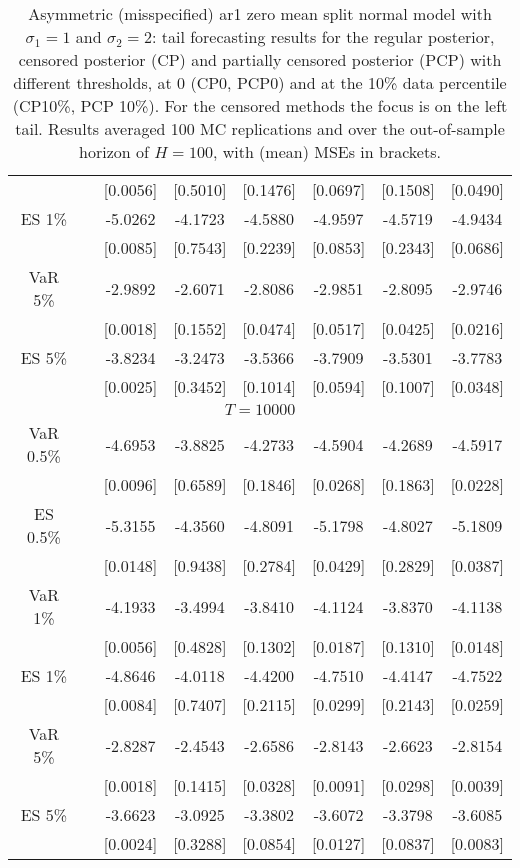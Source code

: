 {{\begin{table}
\begin{tabular}{cc cccccc}
  && [0.0056] & [0.5010] & [0.1476] & [0.0697] & [0.1508] & [0.0490] \\ 
\rowcolor{LightCyan} 
ES 1\% && -5.0262 & -4.1723 & -4.5880 & -4.9597 & -4.5719 & -4.9434 \\ 
  && [0.0085] & [0.7543] & [0.2239] & [0.0853] & [0.2343] & [0.0686] \\ [1ex]
\rowcolor{LightCyan} 
VaR 5\% && -2.9892 & -2.6071 & -2.8086 & -2.9851 & -2.8095 & -2.9746 \\ 
 && [0.0018] & [0.1552] & [0.0474] & [0.0517] & [0.0425] & [0.0216] \\ 
\rowcolor{LightCyan} 
ES 5\% && -3.8234 & -3.2473 & -3.5366 & -3.7909 & -3.5301 & -3.7783 \\ 
 && [0.0025] & [0.3452] & [0.1014] & [0.0594] & [0.1007] & [0.0348] \\ 
\hline 
\multicolumn{8}{c}{$T =10000$}  \\ 
\hline 
\rowcolor{LightCyan} 
VaR 0.5\% && -4.6953 & -3.8825 & -4.2733 & -4.5904 & -4.2689 & -4.5917 \\ 
  && [0.0096] & [0.6589] & [0.1846] & [0.0268] & [0.1863] & [0.0228] \\ 
\rowcolor{LightCyan} 
ES 0.5\% && -5.3155 & -4.3560 & -4.8091 & -5.1798 & -4.8027 & -5.1809 \\ 
  && [0.0148] & [0.9438] & [0.2784] & [0.0429] & [0.2829] & [0.0387] \\ [1ex]
\rowcolor{LightCyan} 
VaR 1\% && -4.1933 & -3.4994 & -3.8410 & -4.1124 & -3.8370 & -4.1138 \\ 
  && [0.0056] & [0.4828] & [0.1302] & [0.0187] & [0.1310] & [0.0148] \\ 
\rowcolor{LightCyan} 
ES 1\% && -4.8646 & -4.0118 & -4.4200 & -4.7510 & -4.4147 & -4.7522 \\ 
  && [0.0084] & [0.7407] & [0.2115] & [0.0299] & [0.2143] & [0.0259] \\ [1ex]
\rowcolor{LightCyan} 
VaR 5\% && -2.8287 & -2.4543 & -2.6586 & -2.8143 & -2.6623 & -2.8154 \\ 
 && [0.0018] & [0.1415] & [0.0328] & [0.0091] & [0.0298] & [0.0039] \\ 
\rowcolor{LightCyan} 
ES 5\% && -3.6623 & -3.0925 & -3.3802 & -3.6072 & -3.3798 & -3.6085 \\ 
 && [0.0024] & [0.3288] & [0.0854] & [0.0127] & [0.0837] & [0.0083] \\ 
\hline 
\end{tabular}
 \caption{Asymmetric (misspecified) ar1 zero mean split normal model with $\sigma_{1} = 1$ and $\sigma_{2} = 2$:  tail forecasting results for the regular posterior, censored posterior (CP)  and partially censored posterior (PCP) with different thresholds,  at $0$ (CP0, PCP0) and at the 10\% data percentile (CP10\%, PCP 10\%).  For the censored methods the focus is on the left tail.  Results averaged 100 MC replications and over the out-of-sample horizon of $H=100$,  with (mean) MSEs in brackets.} 
\label{tab:ar1_s2_pcp_var_es}  
\end{table}
}}